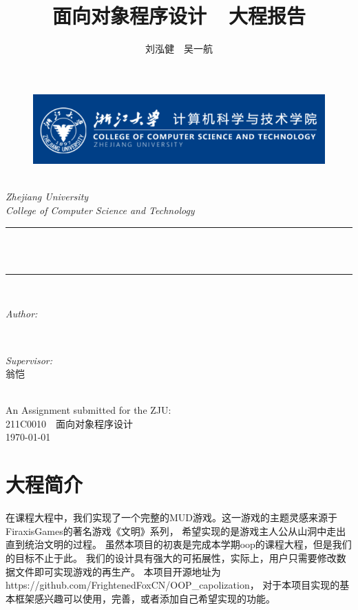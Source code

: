 \documentclass[UTF8]{ctexart}
\title{\heiti 面向对象程序设计\ \ 大程报告}
\author{\Large \kaishu \textup{刘泓健\ \ 吴一航}}
\begin{document}
\begin{titlepage}
	\newcommand{\HRule}{\rule{\linewidth}{0.5mm}}
	\begin{figure}
        \flushleft
        \includegraphics[scale=0.4]{0.png}
    \end{figure}
    \center 
	\quad\\[1.5cm]
	\textsl{\Large Zhejiang University }\\[0.5cm] 
	\textsl{\large College of Computer Science and Technology}\\[0.5cm] 
	\makeatletter
	\HRule \\[0.4cm]
	{ \huge \bfseries \@title}\\[0.4cm] 
	\HRule \\[1.5cm]
	\begin{minipage}{0.4\textwidth}
		\begin{flushleft} \Large
			\emph{Author:}\\
			\@author 
		\end{flushleft}
	\end{minipage}
	~
	\begin{minipage}{0.4\textwidth}
		\begin{flushright} \Large \kaishu
			\emph{Supervisor:} \\
			\textup{翁恺}
		\end{flushright}
	\end{minipage}\\[3cm]
	\makeatother
	{\large An Assignment submitted for the ZJU:}\\[0.5cm]
	{\large {211C0010\ \ 面向对象程序设计}}\\[0.5cm]
	{\large \today}\\[2cm] 
	\vfill 
\end{titlepage}
    
    \section{大程简介}
    在课程大程中，我们实现了一个完整的MUD游戏。这一游戏的主题灵感来源于FiraxisGames的著名游戏《文明》系列，
    希望实现的是游戏主人公从山洞中走出直到统治文明的过程。
    虽然本项目的初衷是完成本学期oop的课程大程，但是我们的目标不止于此。
    我们的设计具有强大的可拓展性，实际上，用户只需要修改数据文件即可实现游戏的再生产。
    本项目开源地址为https://github.com/FrightenedFoxCN/OOP\_capolization， 
    对于本项目实现的基本框架感兴趣可以使用，完善，或者添加自己希望实现的功能。
\end{document}

